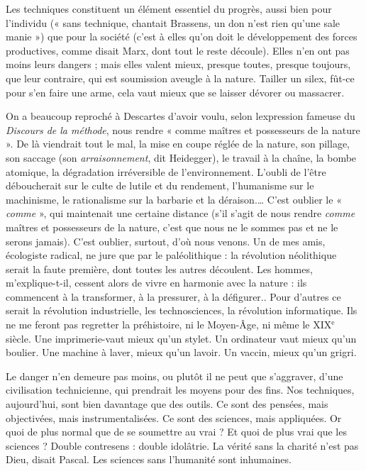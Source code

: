 Les techniques constituent un élément essentiel du progrès, aussi bien pour
l'individu (« sans technique, chantait Brassens, un don n’est rien qu’une sale
manie ») que pour la société (c’est à elles qu’on doit le développement des
forces productives, comme disait Marx, dont tout le reste découle). Elles n’en
ont pas moins leurs dangers ; mais elles valent mieux, presque toutes, presque
toujours, que leur contraire, qui est soumission aveugle à la nature. Tailler un
silex, fût-ce pour s’en faire une arme, cela vaut mieux que se laisser dévorer ou
massacrer.

On a beaucoup reproché à Descartes d’avoir voulu, selon lexpression
fameuse du {\it Discours de la méthode}, nous rendre « comme maîtres et possesseurs
de la nature ». De là viendrait tout le mal, la mise en coupe réglée de la nature,
son pillage, son saccage (son {\it arraisonnement}, dit Heidegger), le travail à la
chaîne, la bombe atomique, la dégradation irréversible de l’environnement.
L’oubli de l’être déboucherait sur le culte de lutile et du rendement, l’humanisme
sur le machinisme, le rationalisme sur la barbarie et la déraison.… C’est
oublier le « {\it comme} », qui maintenait une certaine distance (s’il s’agit de nous
rendre {\it comme} maîtres et possesseurs de la nature, c’est que nous ne le sommes
pas et ne le serons jamais). C’est oublier, surtout, d’où nous venons. Un de mes
amis, écologiste radical, ne jure que par le paléolithique : la révolution néolithique
serait la faute première, dont toutes les autres découlent. Les hommes,
m’explique-t-il, cessent alors de vivre en harmonie avec la nature : ils commencent
à la transformer, à la pressurer, à la défigurer.. Pour d’autres ce serait la
révolution industrielle, les technosciences, la révolution informatique. Ils ne
me feront pas regretter la préhistoire, ni le Moyen-Âge, ni même le {\footnotesize XIX$^\text{e}$} siècle.
Une imprimerie-vaut mieux qu’un stylet. Un ordinateur vaut mieux qu’un
boulier. Une machine à laver, mieux qu’un lavoir. Un vaccin, mieux qu’un
grigri.

Le danger n’en demeure pas moins, ou plutôt il ne peut que s’aggraver,
d’une civilisation technicienne, qui prendrait les moyens pour des fins. Nos
techniques, aujourd’hui, sont bien davantage que des outils. Ce sont des pensées,
mais objectivées, mais instrumentalisées. Ce sont des sciences, mais appliquées.
Or quoi de plus normal que de se soumettre au vrai ? Et quoi de plus
vrai que les sciences ? Double contresens : double idolâtrie. La vérité sans la
charité n’est pas Dieu, disait Pascal. Les sciences sans l'humanité sont inhumaines.

